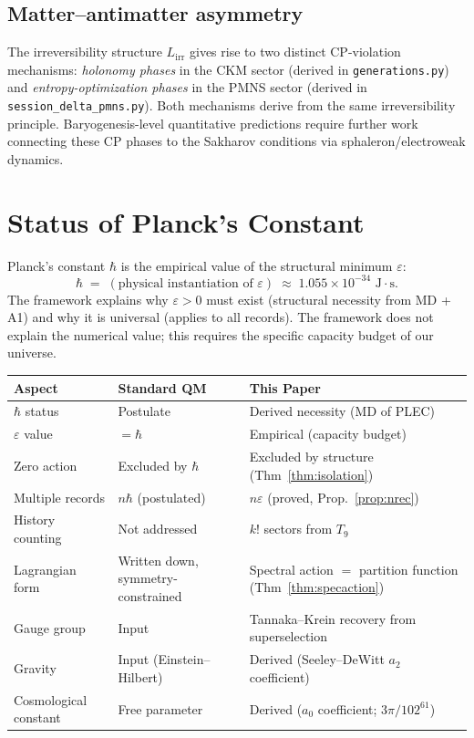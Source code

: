 \documentclass[11pt]{article}
\theoremstyle{definition}
\begin{document}
\subsection{Matter--antimatter asymmetry}
The irreversibility structure $L_{\mathrm{irr}}$ gives rise to two distinct CP-violation mechanisms: \emph{holonomy phases} in the CKM sector (derived in \texttt{generations.py}) and \emph{entropy-optimization phases} in the PMNS sector (derived in \texttt{session\_delta\_pmns.py}).  Both mechanisms derive from the same irreversibility principle.  Baryogenesis-level quantitative predictions require further work connecting these CP phases to the Sakharov conditions via sphaleron/electroweak dynamics.

\section{Status of Planck's Constant}\label{sec:hbar}
Planck's constant $\hbar$ is the empirical value of the structural minimum $\varepsilon$:
\[
\hbar \;=\; (\text{physical instantiation of } \varepsilon) \;\approx\; 1.055 \times 10^{-34} \text{ J}\cdot\text{s}.
\]
The framework explains why $\varepsilon > 0$ must exist (structural necessity from MD + A1) and why it is universal (applies to all records).  The framework does not explain the numerical value; this requires the specific capacity budget of our universe.

\begin{center}
\begin{tabular}{@{}lll@{}}
\toprule
\textbf{Aspect} & \textbf{Standard QM} & \textbf{This Paper} \\ \midrule
$\hbar$ status & Postulate & Derived necessity (MD of PLEC) \\
$\varepsilon$ value & $=\hbar$ & Empirical (capacity budget) \\
Zero action & Excluded by $\hbar$ & Excluded by structure (Thm~\ref{thm:isolation}) \\
Multiple records & $n\hbar$ (postulated) & $n\varepsilon$ (proved, Prop.~\ref{prop:nrec}) \\
History counting & Not addressed & $k!$ sectors from $T_9$ \\
Lagrangian form & Written down, symmetry-constrained & Spectral action $=$ partition function (Thm~\ref{thm:specaction}) \\
Gauge group & Input & Tannaka--Krein recovery from superselection \\
Gravity & Input (Einstein--Hilbert) & Derived (Seeley--DeWitt $a_2$ coefficient) \\
Cosmological constant & Free parameter & Derived ($a_0$ coefficient; $3\pi/102^{61}$) \\
\bottomrule
\end{tabular}
\end{center}
\end{document}
